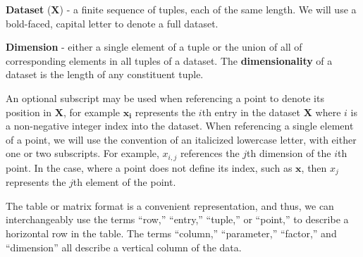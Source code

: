 \begin{defn}
  \textbf{Dataset} ($\mathbf{X}$) - a finite sequence of tuples, each of the
  same length. We will use a bold-faced, capital letter to denote a full dataset.
\end{defn}

\begin{defn}
  \textbf{Dimension} - either a single element of a tuple or the
  union of all of corresponding elements in all tuples of a dataset.
  The \textbf{dimensionality} of a dataset is the length of any constituent
  tuple.
\end{defn}

An optional subscript may be used when referencing a point to denote its position in $\mathbf{X}$, for example $\mathbf{x_i}$ represents the $i$th entry in the dataset $\mathbf{X}$ where $i$ is a non-negative integer index into the dataset.
%
When referencing a single element of a point, we will use the convention of an italicized lowercase letter, with either one or two subscripts.
%
For example, $x_{i,j}$ references the $j$th dimension of the $i$th point.
%
In the case, where a point does not define its index, such as $\mathbf{x}$, then $x_j$ represents the $j$th element of the point.

The table or matrix format is a convenient representation, and thus, we can interchangeably use the terms ``row,'' ``entry,'' ``tuple,'' or ``point,'' to describe a horizontal row in the table.
%
The terms ``column,'' ``parameter,'' ``factor,'' and ``dimension'' all describe a vertical column of the data.

